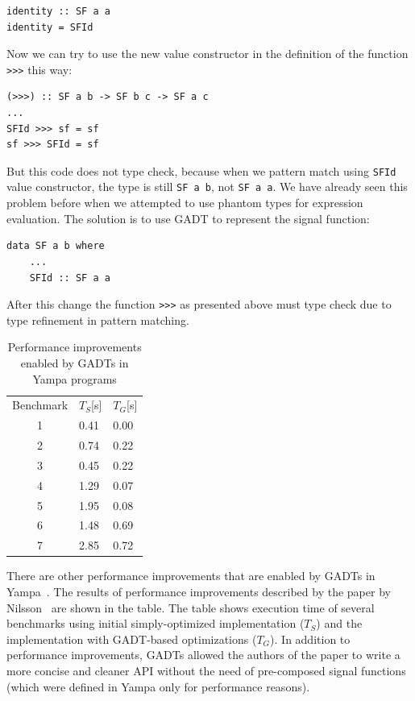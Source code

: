 \documentclass{tmr}
\begin{document}
\begin{Verbatim}
identity :: SF a a
identity = SFId
\end{Verbatim}

Now we can try to use the new value constructor in the definition of the function \verb|>|\verb|>|\verb|>| this way:

\begin{Verbatim}
(>>>) :: SF a b -> SF b c -> SF a c
...
SFId >>> sf = sf
sf >>> SFId = sf
\end{Verbatim}

But this code does not type check, because when we pattern match using \verb|SFId| value constructor, the type is still \verb|SF a b|, not \verb|SF a a|. We have already seen this problem before when we attempted to use phantom types for expression evaluation. The solution is to use GADT to represent the signal function:

\begin{Verbatim}
data SF a b where
    ...
    SFId :: SF a a
\end{Verbatim}

After this change the function \verb|>|\verb|>|\verb|>| as presented above must type check due to type refinement in pattern matching.

\begin{table}[float,captionpos=b,belowcaptionskip=4pt]
\centering
\begin{tabular}{cll}
\hline\noalign{\smallskip}
Benchmark & $T_S$[s] & $T_G$[s]\\
\noalign{\smallskip}
\hline
\noalign{\smallskip}
1 & 0.41 & 0.00 \\
2 & 0.74 & 0.22 \\
3 & 0.45 & 0.22 \\
4 & 1.29 & 0.07 \\
5 & 1.95 & 0.08 \\
6 & 1.48 & 0.69 \\
7 & 2.85 & 0.72 \\
\hline
\end{tabular}
\label{tab:yampa_performance}
\caption{Performance improvements enabled by GADTs in Yampa programs}
\end{table}

There are other performance improvements that are enabled by GADTs in Yampa~\cite{yampa_gadts}. The results of performance improvements described by the paper by Nilsson~\cite{yampa_gadts} are shown in the table. The table shows execution time of several benchmarks using initial simply-optimized implementation ($T_S$) and the implementation with GADT-based optimizations ($T_G$). In addition to performance improvements, GADTs allowed the authors of the paper to write a more concise and cleaner API without the need of pre-composed signal functions (which were defined in Yampa only for performance reasons).
\end{document}
